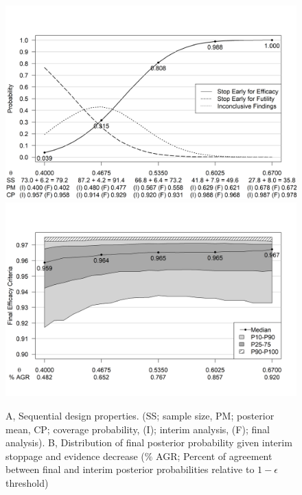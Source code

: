 \documentclass[useAMS,usenatbib,referee]{biom}
\begin{document}
\begin{figure}\begin{center}

    \includegraphics[width=6in]{figure3a.png}
    \includegraphics[width=6in]{figure3b.png}
    \caption{A, Sequential design properties. (SS; sample size, PM; posterior mean, CP; coverage probability, (I); interim analysis, (F); final analysis). B, Distribution of final posterior probability given interim stoppage and evidence decrease ($\%$ AGR; Percent of agreement between final and interim posterior probabilities relative to $1-\epsilon$ threshold)}
	\label{fig:ex1.1}

\end{center}
\end{figure}
\end{document}

